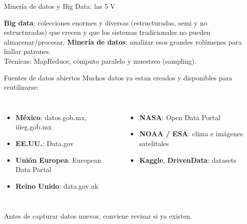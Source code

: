 \documentclass[aspectratio=169]{beamer}
\begin{document}
\begin{frame}[fragile]{Miner\'ia de datos y Big Data: las 5 V}
  \begin{center}
  \end{center}
  \vspace{0.3em}
  \textbf{Big data}: colecciones enormes y diversas (estructuradas, semi y no
  estructuradas) que crecen y que los sistemas tradicionales no pueden
  almacenar/procesar. \textbf{Miner\'ia de datos}: analizar esos grandes
  vol\'umenes para hallar patrones.
  \vspace{0.2em}\\
  \footnotesize T\'ecnicas: MapReduce, c\'omputo paralelo y muestreo (sampling).
\end{frame}

\begin{frame}{Fuentes de datos abiertos}
  Muchos datos ya estan creados y disponibles para reutilizarse:
  \begin{columns}[t]
      \begin{itemize}
        \item \textbf{M\'exico}: datos.gob.mx, iiieg.gob.mx
        \item \textbf{EE.UU.}: Data.gov
        \item \textbf{Uni\'on Europea}: European Data Portal
        \item \textbf{Reino Unido}: data.gov.uk
      \end{itemize}
      \begin{itemize}
        \item \textbf{NASA}: Open Data Portal
        \item \textbf{NOAA / ESA}: clima e im\'agenes satelitales
        \item \textbf{Kaggle}, \textbf{DrivenData}: datasets
      \end{itemize}
  \end{columns}
  \vspace{0.4em}
  Antes de capturar datos nuevos, conviene revisar si ya existen.
\end{frame}
\end{document}
